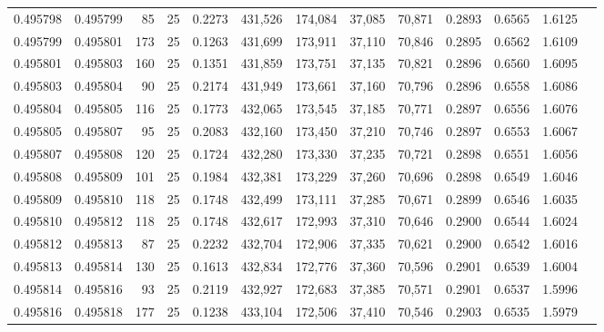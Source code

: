 \begin{tabular}{rrrrrrrrrrrrr}
0.495798 & 0.495799 &    85 &  25 &                                     0.2273 & 431,526 & 174,084 &  37,085 &  70,871 & 0.2893 & 0.6565 & 1.6125 \\
0.495799 & 0.495801 &   173 &  25 &                                     0.1263 & 431,699 & 173,911 &  37,110 &  70,846 & 0.2895 & 0.6562 & 1.6109 \\
0.495801 & 0.495803 &   160 &  25 &                                     0.1351 & 431,859 & 173,751 &  37,135 &  70,821 & 0.2896 & 0.6560 & 1.6095 \\
0.495803 & 0.495804 &    90 &  25 &                                     0.2174 & 431,949 & 173,661 &  37,160 &  70,796 & 0.2896 & 0.6558 & 1.6086 \\
0.495804 & 0.495805 &   116 &  25 &                                     0.1773 & 432,065 & 173,545 &  37,185 &  70,771 & 0.2897 & 0.6556 & 1.6076 \\
0.495805 & 0.495807 &    95 &  25 &                                     0.2083 & 432,160 & 173,450 &  37,210 &  70,746 & 0.2897 & 0.6553 & 1.6067 \\
0.495807 & 0.495808 &   120 &  25 &                                     0.1724 & 432,280 & 173,330 &  37,235 &  70,721 & 0.2898 & 0.6551 & 1.6056 \\
0.495808 & 0.495809 &   101 &  25 &                                     0.1984 & 432,381 & 173,229 &  37,260 &  70,696 & 0.2898 & 0.6549 & 1.6046 \\
0.495809 & 0.495810 &   118 &  25 &                                     0.1748 & 432,499 & 173,111 &  37,285 &  70,671 & 0.2899 & 0.6546 & 1.6035 \\
0.495810 & 0.495812 &   118 &  25 &                                     0.1748 & 432,617 & 172,993 &  37,310 &  70,646 & 0.2900 & 0.6544 & 1.6024 \\
0.495812 & 0.495813 &    87 &  25 &                                     0.2232 & 432,704 & 172,906 &  37,335 &  70,621 & 0.2900 & 0.6542 & 1.6016 \\
0.495813 & 0.495814 &   130 &  25 &                                     0.1613 & 432,834 & 172,776 &  37,360 &  70,596 & 0.2901 & 0.6539 & 1.6004 \\
0.495814 & 0.495816 &    93 &  25 &                                     0.2119 & 432,927 & 172,683 &  37,385 &  70,571 & 0.2901 & 0.6537 & 1.5996 \\
0.495816 & 0.495818 &   177 &  25 &                                     0.1238 & 433,104 & 172,506 &  37,410 &  70,546 & 0.2903 & 0.6535 & 1.5979 \\

\end{tabular}
